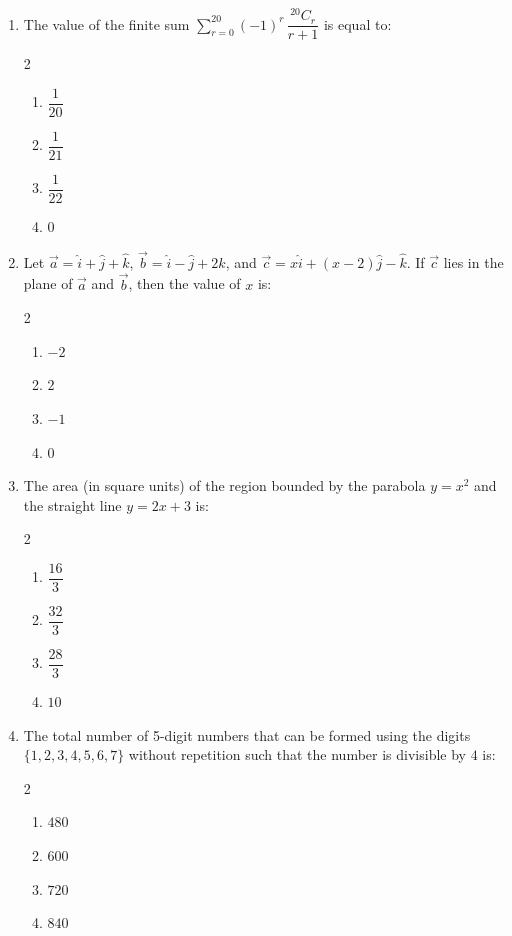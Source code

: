 \documentclass[11pt,a4paper]{article}
\begin{document}
\begin{enumerate}[label=\textbf{\arabic*.},leftmargin=18pt,itemsep=12pt]
  \item The value of the finite sum $\displaystyle\sum_{r=0}^{20} (-1)^r \, \dfrac{^{20}C_r}{r + 1}$ is equal to:
  \begin{multicols}{2}
    \begin{enumerate}[label=(\Alph*)]
      \item $\dfrac{1}{20}$
      \item $\dfrac{1}{21}$
      \item $\dfrac{1}{22}$
      \item $0$
    \end{enumerate}
  \end{multicols}

  \item Let $\vec{a} = \hat{i} + \hat{j} + \hat{k}$, $\vec{b} = \hat{i} - \hat{j} + 2\hat{k}$, and $\vec{c} = x\hat{i} + (x - 2)\hat{j} - \hat{k}$. If $\vec{c}$ lies in the plane of $\vec{a}$ and $\vec{b}$, then the value of $x$ is:
  \begin{multicols}{2}
    \begin{enumerate}[label=(\Alph*)]
      \item $-2$
      \item $2$
      \item $-1$
      \item $0$
    \end{enumerate}
  \end{multicols}

  \item The area (in square units) of the region bounded by the parabola $y = x^2$ and the straight line $y = 2x + 3$ is:
  \begin{multicols}{2}
    \begin{enumerate}[label=(\Alph*)]
      \item $\dfrac{16}{3}$
      \item $\dfrac{32}{3}$
      \item $\dfrac{28}{3}$
      \item $10$
    \end{enumerate}
  \end{multicols}

  \item The total number of 5-digit numbers that can be formed using the digits $\{1, 2, 3, 4, 5, 6, 7\}$ without repetition such that the number is divisible by $4$ is:
  \begin{multicols}{2}
    \begin{enumerate}[label=(\Alph*)]
      \item $480$
      \item $600$
      \item $720$
      \item $840$
    \end{enumerate}
  \end{multicols}


\end{enumerate}
\end{document}
